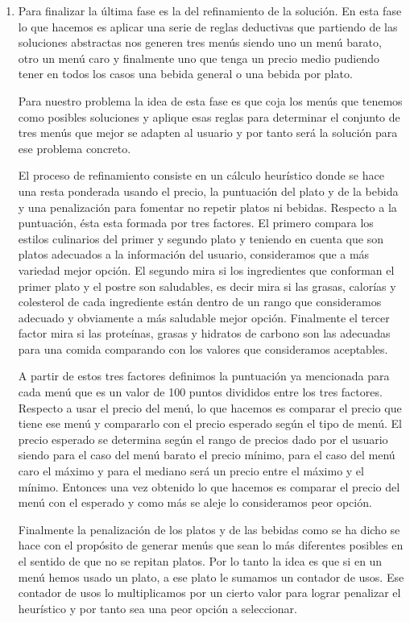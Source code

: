 \documentclass{article}
\begin{document}
\begin {enumerate}
    \item Para finalizar la última fase es la del refinamiento de la solución. En esta fase lo que hacemos es aplicar una serie de reglas deductivas que partiendo de las soluciones abstractas nos generen tres menús siendo uno un menú barato, otro un menú caro y finalmente uno que tenga un precio medio pudiendo tener en todos los casos una bebida general o una bebida por plato.
    \par
    Para nuestro problema la idea de esta fase es que coja los menús que tenemos como posibles soluciones y aplique esas reglas para determinar el conjunto de tres menús que mejor se adapten al usuario y por tanto será la solución para ese problema concreto.
    \par
    El proceso de refinamiento consiste en un cálculo heurístico donde se hace una resta ponderada usando el precio, la puntuación del plato y de la bebida y una penalización para fomentar no repetir platos ni bebidas. Respecto a la puntuación, ésta esta formada por tres factores. El primero compara los estilos culinarios del primer y segundo plato y teniendo en cuenta que son platos adecuados a la información del usuario, consideramos que a más variedad mejor opción. El segundo mira si los ingredientes que conforman el primer plato y el postre son saludables, es decir mira si las grasas, calorías y colesterol de cada ingrediente están dentro de un rango que consideramos adecuado y obviamente a más saludable mejor opción. Finalmente el tercer factor mira si las proteínas, grasas y hidratos de carbono son las adecuadas para una comida comparando con los valores que consideramos aceptables.
    \par
    A partir de estos tres factores definimos la puntuación ya mencionada para cada menú que es un valor de 100 puntos divididos entre los tres factores.
    Respecto a usar el precio del menú, lo que hacemos es comparar el precio que tiene ese menú y compararlo con el precio esperado según el tipo de menú. El precio esperado se determina según el rango de precios dado por el usuario siendo para el caso del menú barato el precio mínimo, para el caso del menú caro el máximo y para el mediano será un precio entre el máximo y el mínimo. Entonces una vez obtenido lo que hacemos es comparar el precio del menú con el esperado y como más se aleje lo consideramos peor opción.
    \par
    Finalmente la penalización de los platos y de las bebidas como se ha dicho se hace con el propósito de generar menús que sean lo más diferentes posibles en el sentido de que no se repitan platos. Por lo tanto la idea es que si en un menú hemos usado un plato, a ese plato le sumamos un contador de usos. Ese contador de usos lo multiplicamos por un cierto valor para lograr penalizar el heurístico y por tanto sea una peor opción a seleccionar.

\end{enumerate}
\end{document}
